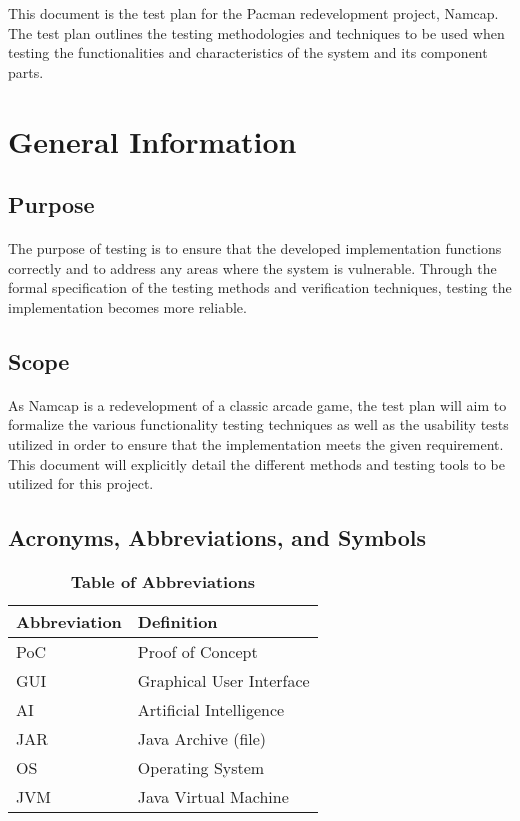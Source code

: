 \documentclass[12pt, titlepage]{article}
\begin{document}
\newpage


This document is the test plan for the Pacman redevelopment project, Namcap. The test plan outlines the testing methodologies and techniques to be used when testing the functionalities and characteristics of the system and its component parts.

\section{General Information}

\subsection{Purpose}
\paragraph{}
The purpose of testing is to ensure that the developed implementation functions correctly and to address any areas where the system is vulnerable. Through the formal specification of the testing methods and verification techniques, testing the implementation becomes more reliable.

\subsection{Scope}
\paragraph{}
As Namcap is a redevelopment of a classic arcade game, the test plan will aim to formalize the various functionality testing techniques as well as the usability tests utilized in order to ensure that the implementation meets the given requirement. This document will explicitly detail the different methods and testing tools to be utilized for this project.

\subsection{Acronyms, Abbreviations, and Symbols}
	
\begin{table}[hbp]
\caption{\textbf{Table of Abbreviations}} \label{Table}

\begin{tabularx}{\textwidth}{p{3cm}X}
\toprule
\textbf{Abbreviation} & \textbf{Definition} \\
\midrule
PoC & Proof of Concept\\
GUI & Graphical User Interface\\
AI & Artificial Intelligence\\
JAR & Java Archive (file)\\
OS & Operating System\\
JVM & Java Virtual Machine\\
\bottomrule
\end{tabularx}

\end{table}
\end{document}
